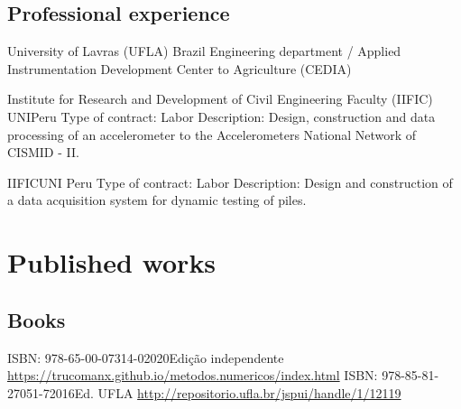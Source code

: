 \documentclass[11pt,a4paper,sans]{moderncv} %
\begin{document}
\subsection{Professional experience}
	      {University of Lavras (UFLA)}
	      {}{Brazil}
	      {Engineering department / Applied Instrumentation Development Center to Agriculture (CEDIA) }


		      {Institute for Research and Development of Civil Engineering Faculty (IIFIC)}
		      {UNI}{Peru}
		      {Type of contract: Labor\newline{}
		      Description: Design, construction and data processing of an accelerometer 
		      to the Accelerometers National Network  of CISMID - II.}

		      {IIFIC}{UNI }{Peru}
		      {Type of contract: Labor\newline{}
		      Description: Design and construction  of  a data acquisition system for dynamic testing of piles.}





\section{Published works}
\subsection{Books}
	      {ISBN: 978-65-00-07314-0}{2020}{Edição independente}
	      {\url{https://trucomanx.github.io/metodos.numericos/index.html}}
	      {ISBN: 978-85-81-27051-7}{2016}{Ed. UFLA}
	      {\url{http://repositorio.ufla.br/jspui/handle/1/12119}}
\end{document}
